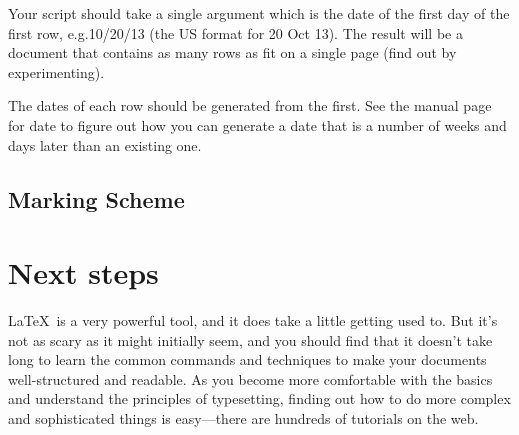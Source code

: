 \begin{refsection}
Your script should take a single argument which is the date of the first day of the first row, e.g.10/20/13 (the US format for 20 Oct 13). The result will be a document that contains as many rows as fit on a single page (find out by experimenting).

The dates of each row should be generated from the first. See the manual page for date to figure out how you can generate a date that is a number of weeks and days later than an existing one.

\begin{demonote}
  \small
  
\end{demonote}

\subsection{Marking Scheme}
\label{section:mark-scheme}




\section{Next steps}

\LaTeX\ is a very powerful tool, and it does take a little getting used to. But it's not as scary as it might initially seem, and you should find that it doesn't take long to learn the common commands and techniques to make your documents well-structured and readable. As you become more comfortable with the basics and understand the principles of typesetting, finding out how to do more complex and sophisticated things is easy---there are hundreds of tutorials on the web. 


\end{refsection}
